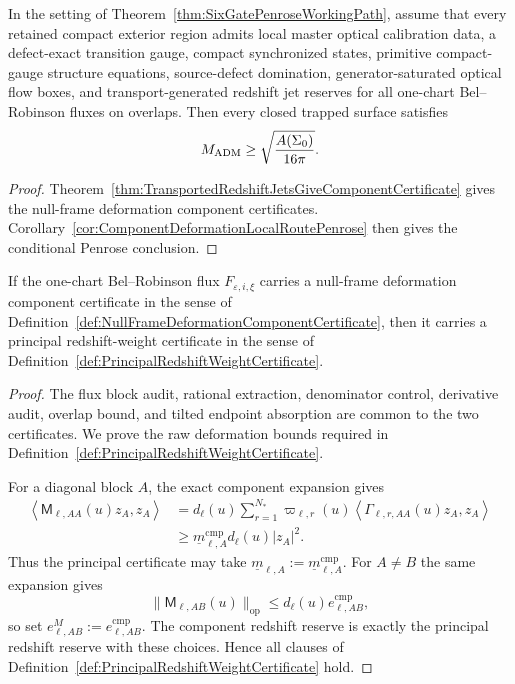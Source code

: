 \begin{corollary}\label{cor:TransportedRedshiftLocalRoutePenrose}
In the setting of Theorem~\ref{thm:SixGatePenroseWorkingPath}, assume that every
retained compact exterior region admits local master optical calibration data, a
defect-exact transition gauge, compact synchronized states, primitive
compact-gauge structure equations, source-defect domination, generator-saturated
optical flow boxes, and transport-generated redshift jet reserves for all
one-chart Bel--Robinson fluxes on overlaps. Then every closed trapped surface
satisfies
\[
    M_{\mathrm{ADM}}\ge \sqrt{\frac{A(\Sigma_0)}{16\pi}} .
\]
\end{corollary}

\begin{proof}
Theorem~\ref{thm:TransportedRedshiftJetsGiveComponentCertificate} gives the
null-frame deformation component certificates.  Corollary~\ref{cor:ComponentDeformationLocalRoutePenrose}
then gives the conditional Penrose conclusion.
\end{proof}

\begin{theorem}\label{thm:DeformationComponentsGivePrincipalWeights}
If the one-chart Bel--Robinson flux $F_{\varepsilon,i,\xi}$ carries a
null-frame deformation component certificate in the sense of
Definition~\ref{def:NullFrameDeformationComponentCertificate}, then it carries
a principal redshift-weight certificate in the sense of
Definition~\ref{def:PrincipalRedshiftWeightCertificate}.
\end{theorem}

\begin{proof}
The flux block audit, rational extraction, denominator control, derivative
audit, overlap bound, and tilted endpoint absorption are common to the two
certificates.  We prove the raw deformation bounds required in
Definition~\ref{def:PrincipalRedshiftWeightCertificate}.

For a diagonal block $A$, the exact component expansion gives
\[
\begin{split}
    \left\langle \mathsf M_{\ell,AA}(u)z_A,z_A\right\rangle
    &=
    d_\ell(u)
    \sum_{r=1}^{N_*}
    \varpi_{\ell,r}(u)
    \left\langle
    \Gamma_{\ell,r,AA}(u)z_A,z_A
    \right\rangle  \\
    &\ge
    \underline m^{\mathrm{cmp}}_{\ell,A}d_\ell(u)|z_A|^2 .
\end{split}
\]
Thus the principal certificate may take
$\underline m_{\ell,A}:=\underline m^{\mathrm{cmp}}_{\ell,A}$.  For
$A\ne B$ the same expansion gives
\[
    \|\mathsf M_{\ell,AB}(u)\|_{\mathrm{op}}
    \le
    d_\ell(u)e^{\mathrm{cmp}}_{\ell,AB},
\]
so set $e^M_{\ell,AB}:=e^{\mathrm{cmp}}_{\ell,AB}$.  The component redshift
reserve is exactly the principal redshift reserve with these choices.  Hence
all clauses of Definition~\ref{def:PrincipalRedshiftWeightCertificate} hold.
\end{proof}

